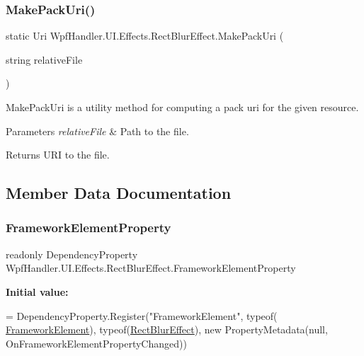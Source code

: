 \subsubsection{\texorpdfstring{Make\+Pack\+Uri()}{MakePackUri()}}
{\footnotesize\ttfamily static Uri Wpf\+Handler.\+U\+I.\+Effects.\+Rect\+Blur\+Effect.\+Make\+Pack\+Uri (\begin{DoxyParamCaption}\item[{string}]{relative\+File }\end{DoxyParamCaption})\hspace{0.3cm}{\ttfamily [static]}}



Make\+Pack\+Uri is a utility method for computing a pack uri for the given resource. 


\begin{DoxyParams}{Parameters}
{\em relative\+File} & Path to the file.\\
\hline
\end{DoxyParams}
\begin{DoxyReturn}{Returns}
U\+RI to the file.
\end{DoxyReturn}


\subsection{Member Data Documentation}
\mbox{\label{class_wpf_handler_1_1_u_i_1_1_effects_1_1_rect_blur_effect_a140029690d8c4a72b4b9a003e7a4643c}} 
\subsubsection{\texorpdfstring{Framework\+Element\+Property}{FrameworkElementProperty}}
{\footnotesize\ttfamily readonly Dependency\+Property Wpf\+Handler.\+U\+I.\+Effects.\+Rect\+Blur\+Effect.\+Framework\+Element\+Property\hspace{0.3cm}{\ttfamily [static]}}

{\bfseries Initial value\+:}
\begin{DoxyCode}
=
            DependencyProperty.Register(\textcolor{stringliteral}{"FrameworkElement"}, typeof(
      \mbox{\hyperlink{class_wpf_handler_1_1_u_i_1_1_effects_1_1_rect_blur_effect_a16fb661a9b5f9f2c7a59eba0bca46198}{FrameworkElement}}), typeof(\mbox{\hyperlink{class_wpf_handler_1_1_u_i_1_1_effects_1_1_rect_blur_effect_a2f78d40f98a923f23467fb795a1d301c}{RectBlurEffect}}),
            \textcolor{keyword}{new} PropertyMetadata(null, OnFrameworkElementPropertyChanged))
\end{DoxyCode}


